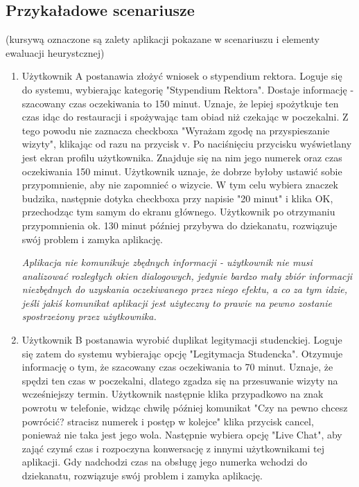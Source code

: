 \documentclass[12pt]{article}
\begin{document}
\subsection{Przykaładowe scenariusze}
(kursywą oznaczone są zalety aplikacji pokazane w scenariuszu i elementy ewaluacji heurystcznej)
\begin {enumerate}
	\item Użytkownik A postanawia złożyć wniosek o stypendium rektora. Loguje się do systemu, wybierając kategorię "Stypendium Rektora". Dostaje informację - szacowany czas oczekiwania to 150 minut. Uznaje, że lepiej spożytkuje ten czas idąc do restauracji i spożywając tam obiad niż czekając w poczekalni. Z tego powodu nie zaznacza checkboxa "Wyrażam zgodę na przyspieszanie wizyty", klikając od razu na przycisk v. Po naciśnięciu przycisku wyświetlany jest ekran profilu użytkownika. Znajduje się na nim jego numerek oraz czas oczekiwania 150 minut. Użytkownik uznaje, że dobrze byłoby ustawić sobie przypomnienie, aby nie zapomnieć o wizycie. W tym celu wybiera znaczek budzika, następnie dotyka checkboxa przy napisie "20 minut" i klika OK, przechodząc tym samym do ekranu głównego. Użytkownik po otrzymaniu przypomnienia ok. 130 minut później przybywa do dziekanatu, rozwiązuje swój problem i zamyka aplikację.
	
	\textit{Aplikacja nie komunikuje zbędnych informacji - użytkownik nie musi analizować rozległych okien dialogowych, jedynie bardzo mały zbiór informacji niezbędnych do uzyskania oczekiwanego przez niego efektu, a co za tym idzie, jeśli jakiś komunikat aplikacji jest użyteczny to prawie na pewno zostanie spostrzeżony przez użytkownika.}\\
	
	
	\item Użytkownik B postanawia wyrobić duplikat legitymacji studenckiej. Loguje się zatem do systemu wybierając opcję "Legitymacja Studencka". Otzymuje informację o tym, że szacowany czas oczekiwania to 70 minut. Uznaje, że spędzi ten czas w poczekalni, dlatego zgadza się na przesuwanie wizyty na wcześniejszy termin. Użytkownik następnie klika przypadkowo na znak powrotu w telefonie, widząc chwilę później komunikat "Czy na pewno chcesz powrócić? stracisz numerek i postęp w kolejce" klika przycisk cancel, ponieważ nie taka jest jego wola. Następnie wybiera opcję "Live Chat", aby zająć czymś czas i rozpoczyna konwersację z innymi użytkownikami tej aplikacji. Gdy nadchodzi czas na obsługę jego numerka wchodzi do dziekanatu, rozwiązuje swój problem i zamyka aplikację.
	

\end{enumerate}
\end{document}
